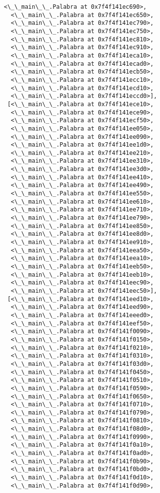 \documentclass[12pt,a4paper,table]{article}
\begin{document}
\begin{tcolorbox}[breakable, size=fbox, boxrule=.5pt, pad at break*=1mm, opacityfill=0]
\begin{Verbatim}[commandchars=\\\{\}]
  <\_\_main\_\_.Palabra at 0x7f4f141ec690>,
  <\_\_main\_\_.Palabra at 0x7f4f141ec650>,
  <\_\_main\_\_.Palabra at 0x7f4f141ec790>,
  <\_\_main\_\_.Palabra at 0x7f4f141ec750>,
  <\_\_main\_\_.Palabra at 0x7f4f141ec810>,
  <\_\_main\_\_.Palabra at 0x7f4f141ec910>,
  <\_\_main\_\_.Palabra at 0x7f4f141eca10>,
  <\_\_main\_\_.Palabra at 0x7f4f141ecad0>,
  <\_\_main\_\_.Palabra at 0x7f4f141ecb50>,
  <\_\_main\_\_.Palabra at 0x7f4f141ecc10>,
  <\_\_main\_\_.Palabra at 0x7f4f141ecd10>,
  <\_\_main\_\_.Palabra at 0x7f4f141eccd0>],
 [<\_\_main\_\_.Palabra at 0x7f4f141ece10>,
  <\_\_main\_\_.Palabra at 0x7f4f141ece90>,
  <\_\_main\_\_.Palabra at 0x7f4f141ecf50>,
  <\_\_main\_\_.Palabra at 0x7f4f141ee050>,
  <\_\_main\_\_.Palabra at 0x7f4f141ee090>,
  <\_\_main\_\_.Palabra at 0x7f4f141ee1d0>,
  <\_\_main\_\_.Palabra at 0x7f4f141ee210>,
  <\_\_main\_\_.Palabra at 0x7f4f141ee310>,
  <\_\_main\_\_.Palabra at 0x7f4f141ee3d0>,
  <\_\_main\_\_.Palabra at 0x7f4f141ee410>,
  <\_\_main\_\_.Palabra at 0x7f4f141ee490>,
  <\_\_main\_\_.Palabra at 0x7f4f141ee550>,
  <\_\_main\_\_.Palabra at 0x7f4f141ee610>,
  <\_\_main\_\_.Palabra at 0x7f4f141ee710>,
  <\_\_main\_\_.Palabra at 0x7f4f141ee790>,
  <\_\_main\_\_.Palabra at 0x7f4f141ee850>,
  <\_\_main\_\_.Palabra at 0x7f4f141ee8d0>,
  <\_\_main\_\_.Palabra at 0x7f4f141ee910>,
  <\_\_main\_\_.Palabra at 0x7f4f141eea50>,
  <\_\_main\_\_.Palabra at 0x7f4f141eea10>,
  <\_\_main\_\_.Palabra at 0x7f4f141eeb50>,
  <\_\_main\_\_.Palabra at 0x7f4f141eeb10>,
  <\_\_main\_\_.Palabra at 0x7f4f141eec90>,
  <\_\_main\_\_.Palabra at 0x7f4f141eec50>],
 [<\_\_main\_\_.Palabra at 0x7f4f141eed10>,
  <\_\_main\_\_.Palabra at 0x7f4f141eed90>,
  <\_\_main\_\_.Palabra at 0x7f4f141eeed0>,
  <\_\_main\_\_.Palabra at 0x7f4f141eef50>,
  <\_\_main\_\_.Palabra at 0x7f4f141f0090>,
  <\_\_main\_\_.Palabra at 0x7f4f141f0150>,
  <\_\_main\_\_.Palabra at 0x7f4f141f0210>,
  <\_\_main\_\_.Palabra at 0x7f4f141f0310>,
  <\_\_main\_\_.Palabra at 0x7f4f141f03d0>,
  <\_\_main\_\_.Palabra at 0x7f4f141f0450>,
  <\_\_main\_\_.Palabra at 0x7f4f141f0510>,
  <\_\_main\_\_.Palabra at 0x7f4f141f0590>,
  <\_\_main\_\_.Palabra at 0x7f4f141f0650>,
  <\_\_main\_\_.Palabra at 0x7f4f141f0710>,
  <\_\_main\_\_.Palabra at 0x7f4f141f0790>,
  <\_\_main\_\_.Palabra at 0x7f4f141f0810>,
  <\_\_main\_\_.Palabra at 0x7f4f141f08d0>,
  <\_\_main\_\_.Palabra at 0x7f4f141f0990>,
  <\_\_main\_\_.Palabra at 0x7f4f141f0a10>,
  <\_\_main\_\_.Palabra at 0x7f4f141f0ad0>,
  <\_\_main\_\_.Palabra at 0x7f4f141f0b90>,
  <\_\_main\_\_.Palabra at 0x7f4f141f0bd0>,
  <\_\_main\_\_.Palabra at 0x7f4f141f0d10>,
  <\_\_main\_\_.Palabra at 0x7f4f141f0d90>,

\end{Verbatim}
\end{tcolorbox}
\end{document}
